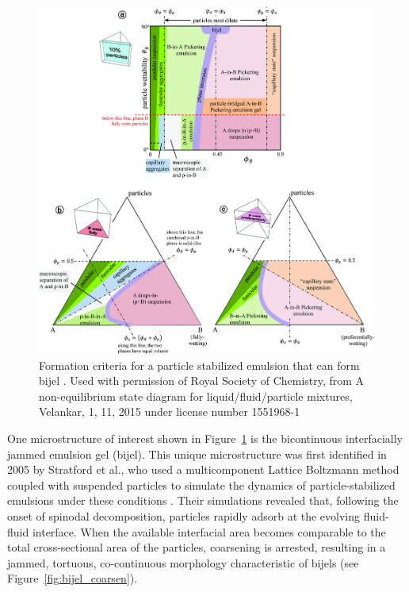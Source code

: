 \begin{figure}
    \centering
    \includegraphics[scale = 0.3]{figures/literature_review/state_diagram.jpg}
    \caption{Formation criteria for a particle stabilized emulsion that can form bijel \cite{velankar_non-equilibrium_2015}.
            Used with permission of Royal Society of Chemistry, from A non-equilibrium state diagram for liquid/fluid/particle 
            mixtures, Velankar, 1, 11, 2015 under license number 1551968-1}
    \label{fig:state_diagram_particle_emulsions}
\end{figure}

One microstructure of interest shown in Figure~\ref{fig:state_diagram_particle_emulsions} is the bicontinuous interfacially jammed emulsion gel (bijel). This unique microstructure was 
first identified in 2005 by Stratford et al., who used a multicomponent Lattice Boltzmann method coupled with suspended particles to simulate the 
dynamics of particle-stabilized emulsions under these conditions \cite{stratford_colloidal_2005}. Their simulations revealed that, following the onset of spinodal decomposition, particles 
rapidly adsorb at the evolving fluid-fluid interface. When the available interfacial area becomes comparable to the total cross-sectional area of the particles, coarsening is arrested, 
resulting in a jammed, tortuous, co-continuous morphology characteristic of bijels (see Figure~\ref{fig:bijel_coarsen}).

